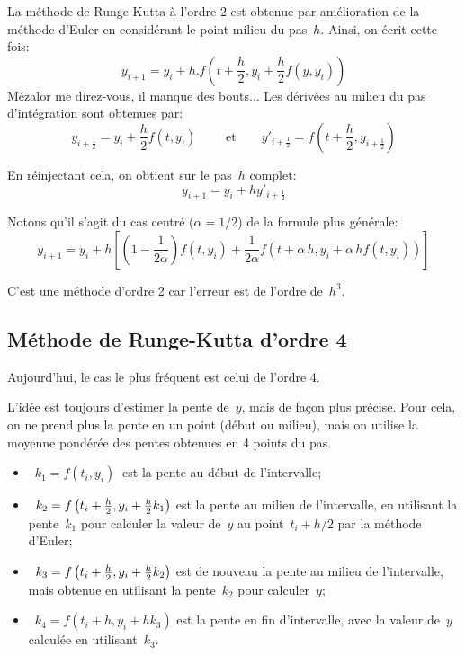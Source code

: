 La méthode de Runge-Kutta à l'ordre 2 est obtenue par amélioration
de la méthode d'Euler en considérant le point milieu du pas~$h$.
Ainsi, on écrit cette fois:
\begin{equation}
y_{i+1}=y_i+h.f\left(t+\frac{h}2,y_i+\frac{h}2f(y,y_i)\right)
\end{equation}
Mézalor me direz-vous, il manque des bouts...
Les dérivées au milieu du pas d'intégration sont obtenues par:
\begin{equation}
  y_{i+\frac{1}{2}} = y_i + \frac{h}{2} f \left( t, y_i \right) \qquad \text{ et} \qquad
  y'_{i+\frac{1}{2}} = f \left( t + \frac{h}{2}, y_{i+\frac{1}{2}} \right) 
\end{equation}

En réinjectant cela, on obtient sur le pas~$h$ complet:
\begin{equation}
  y_{i+1} = y_i + h y'_{i+\frac{1}{2}} 
\end{equation}

\medskip
Notons qu'il s'agit du cas centré ($\alpha=1/2$) de la formule plus
générale:
\begin{equation}
y_{i+1} = y_i + h\left[\left(1-\frac1{2\alpha}\right)f \left( t, y_i \right) + \frac1{2\alpha}f \left( t + \alpha\,h, y_i + \alpha\,h f \left( t, y_i \right) \right)\right] 
\end{equation}

\medskip
C'est une méthode d'ordre 2 car l'erreur est de l'ordre de~$h^3$.


\medskip
\subsection{Méthode de Runge-Kutta d'ordre 4}

Aujourd'hui, le cas le plus fréquent est celui de l'ordre 4.

L'idée est toujours d'estimer la pente de~$y$, mais de façon plus précise.
Pour cela, on ne prend plus la pente en un point (début ou milieu), mais on utilise
la moyenne pondérée des pentes obtenues en 4 points du pas.
\begin{itemize}
  \item~$k_1 = f \left( t_i, y_i \right)~$ est la pente au début de l'intervalle;
  \item~$k_2 = f \left( t_i + {h \over 2}, y_i + {h\over 2} k_1 \right)$ est la pente 
	au milieu de l'intervalle, en utilisant la pente~$k_1$ pour calculer la valeur de~$y$ 
	au point~$t_i + h/2$ par la méthode d'Euler;
  \item~$k_3 = f \left( t_i + {h \over 2}, y_i + {h\over 2} k_2 \right)$ est de nouveau 
	la pente au milieu de l'intervalle, mais obtenue en utilisant la pente~$k_2$ pour calculer~$y$;
  \item~$k_4 = f \left( t_i + h, y_i + h k_3\right)$ est la pente en fin d'intervalle, avec la valeur 
	de~$y$ calculée en utilisant~$k_3$.
\end{itemize}

